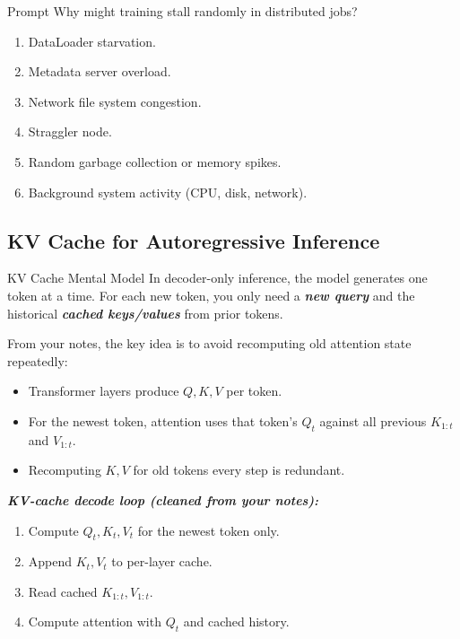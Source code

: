 \documentclass[12pt]{article}
\let\origtextbf\textbf
\renewcommand{\textbf}[1]{\origtextbf{\textit{#1}}}
\begin{document}
\begin{greenbox}{Prompt}
Why might training stall randomly in distributed jobs?
\begin{enumerate}[leftmargin=1.3em]
\item DataLoader starvation.
\item Metadata server overload.
\item Network file system congestion.
\item Straggler node.
\item Random garbage collection or memory spikes.
\item Background system activity (CPU, disk, network).
\end{enumerate}
\end{greenbox}

\vspace{2cm}


\subsection{KV Cache for Autoregressive Inference}

\begin{bluebox}{KV Cache Mental Model}
In decoder-only inference, the model generates one token at a time.  
For each new token, you only need a \textbf{new query} and the historical \textbf{cached keys/values} from prior tokens.
\end{bluebox}

From your notes, the key idea is to avoid recomputing old attention state repeatedly:
\begin{itemize}
\item Transformer layers produce \(Q, K, V\) per token.
\item For the newest token, attention uses that token's \(Q_t\) against all previous \(K_{1:t}\) and \(V_{1:t}\).
\item Recomputing \(K,V\) for old tokens every step is redundant.
\end{itemize}

\textbf{KV-cache decode loop (cleaned from your notes):}
\begin{enumerate}[leftmargin=1.3em]
\item Compute \(Q_t, K_t, V_t\) for the newest token only.
\item Append \(K_t, V_t\) to per-layer cache.
\item Read cached \(K_{1:t}, V_{1:t}\).
\item Compute attention with \(Q_t\) and cached history.
\end{enumerate}
\end{document}

